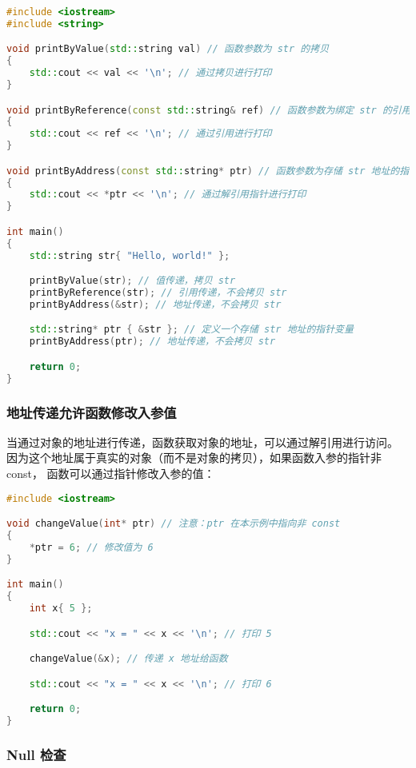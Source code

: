\documentclass[../../LearnCpp.tex]{subfiles}
\begin{document}

\begin{lstlisting}[language=C++]
#include <iostream>
#include <string>

void printByValue(std::string val) // 函数参数为 str 的拷贝
{
    std::cout << val << '\n'; // 通过拷贝进行打印
}

void printByReference(const std::string& ref) // 函数参数为绑定 str 的引用
{
    std::cout << ref << '\n'; // 通过引用进行打印
}

void printByAddress(const std::string* ptr) // 函数参数为存储 str 地址的指针
{
    std::cout << *ptr << '\n'; // 通过解引用指针进行打印
}

int main()
{
    std::string str{ "Hello, world!" };

    printByValue(str); // 值传递，拷贝 str
    printByReference(str); // 引用传递，不会拷贝 str
    printByAddress(&str); // 地址传递，不会拷贝 str

    std::string* ptr { &str }; // 定义一个存储 str 地址的指针变量
    printByAddress(ptr); // 地址传递，不会拷贝 str

    return 0;
}
\end{lstlisting}

\subsubsection*{地址传递允许函数修改入参值}

当通过对象的地址进行传递，函数获取对象的地址，可以通过解引用进行访问。
因为这个地址属于真实的对象（而不是对象的拷贝），如果函数入参的指针非 const，
函数可以通过指针修改入参的值：

\begin{lstlisting}[language=C++]
#include <iostream>

void changeValue(int* ptr) // 注意：ptr 在本示例中指向非 const
{
    *ptr = 6; // 修改值为 6
}

int main()
{
    int x{ 5 };

    std::cout << "x = " << x << '\n'; // 打印 5

    changeValue(&x); // 传递 x 地址给函数

    std::cout << "x = " << x << '\n'; // 打印 6

    return 0;
}
\end{lstlisting}

\subsubsection*{Null 检查}
\end{document}
